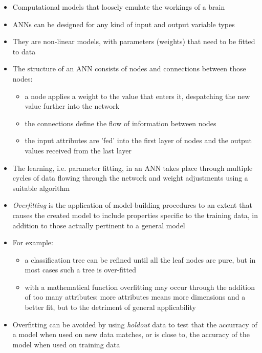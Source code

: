 \vspace*{1ex}
\begin{itemize}
\item Computational models that loosely emulate the workings of a brain
\item ANNs can be designed for any kind of input and output variable types
\item They are non-linear models, with parameters (weights) that need to be fitted to data
\item The structure of an ANN consists of nodes and connections between those nodes:
  \begin{itemize}
  \item a node applies a weight to the value that enters it, despatching the new value further into the network
  \item the connections define the flow of information between nodes
  \item the input attributes are 'fed' into the first layer of nodes and the output values received from the last layer
  \end{itemize}
  \item The learning, i.e. parameter fitting, in an ANN takes place through multiple cycles of data flowing through the network and weight adjustments using a suitable algorithm 
\end{itemize}
\newpage

\begin{itemize}
\item \emph{Overfitting} is the application of model-building procedures to an extent that causes the created model to include properties specific to the training data, in addition to those actually pertinent to a general model
\item For example:
  \begin{itemize}
  \item a classification tree can be refined until all the leaf nodes are pure, but in most cases such a tree is over-fitted
  \item with a mathematical function overfitting may occur through the addition of too many attributes: more attributes means more dimensions and a better fit, but to the detriment of general applicability
  \end{itemize}
\item Overfitting can be avoided by using \emph{holdout} data to test that the accurracy of a model when used on new data matches, or is close to, the accuracy of the model when used on training data
\end{itemize}
\newpage

